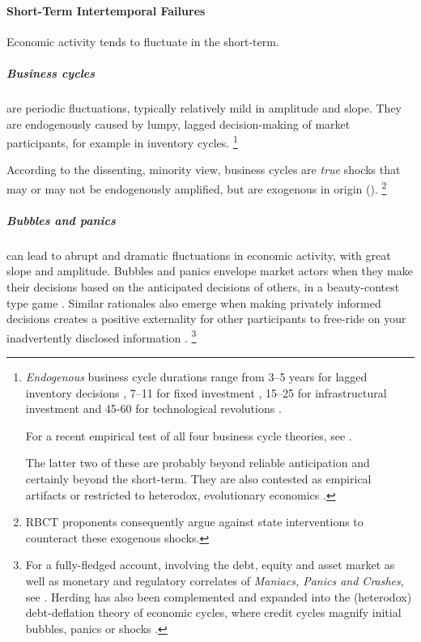 \paragraph{Short-Term Intertemporal Failures}
	\label{sec:short-term-inconsistency}
Economic activity tends to fluctuate in the short-term.

\subparagraph{Business cycles} are periodic fluctuations, typically relatively mild in amplitude and slope.
They are endogenously caused by lumpy, lagged decision-making of market participants, for example in inventory cycles.
\footnote{
	\emph{Endogenous} business cycle durations range from 3--5 years for lagged inventory decisions \citep{Kitchin1923}, 7--11 for fixed investment \citep{Juglar1862}, 15--25 for infrastructural investment \citep{Kuznets1930} and 45-60 for technological revolutions \citep{Kondratiev1925}.

	For a recent empirical test of all four business cycle theories, see \cite{Korotayev2010}.

	The latter two of these are probably beyond reliable anticipation and certainly beyond the short-term.
	They are also contested as empirical artifacts \citep{Howrey1968} or restricted to heterodox, evolutionary economics \citep{Modelski2010}.
}

According to the dissenting, minority view, business cycles are \emph{true} shocks that may or may not be endogenously amplified, but are exogenous in origin (\citealt{Kydland1982}).
\footnote{
	\gls{RBCT} proponents consequently argue against state interventions to counteract these exogenous shocks.
}

\subparagraph{Bubbles and panics}
can lead to abrupt and dramatic fluctuations in economic activity, with great slope and amplitude.
Bubbles and panics envelope market actors when they make their decisions based on the anticipated decisions of others, in a beauty-contest type game \citep{Keynes1936}.
Similar rationales also emerge when making privately informed decisions creates a positive externality for other participants to free-ride on your inadvertently disclosed information \citep{Banerjee-1992-aa}.
\footnote{
	For a fully-fledged account, involving the debt, equity and asset market as well as monetary and regulatory correlates of \emph{Maniacs, Panics and Crashes}, see \cite{KindlebergerAliber-2005-aa}.
	Herding has also been complemented and expanded into the (heterodox) debt-deflation theory of economic cycles, where credit cycles magnify initial bubbles, panics or shocks \citep{Fisher1933}.
}

